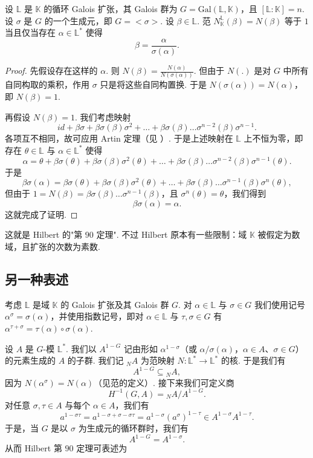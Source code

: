 \begin{theorem}\label{c5-thm-4-3}
设 $\mathbb{L}$ 是 $\mathbb{K}$ 的循环 Galois 扩张，其 Galois 群为 $G=\mathrm{Gal}(\mathbb{L},\mathbb{K})$，且 $[\mathbb{L}:\mathbb{K}]=n$. 设 $\sigma$ 是 $G$ 的一个生成元，即 $G=<\sigma>$. 设 $\beta\in\mathbb{L}$. 范 $N_{\mathbb{K}}^{\mathbb{L}}(\beta)=N(\beta)$ 等于 $1$ 当且仅当存在 $\alpha\in\mathbb{L}^*$ 使得
\[
\beta=\frac{\alpha}{\sigma(\alpha)}.
\]
\end{theorem}

\begin{proof}
先假设存在这样的 $\alpha$. 则 $N(\beta)=\frac{N(\alpha)}{N(\sigma(\alpha))}$. 但由于 $N(.)$ 是对 $G$ 中所有自同构取的乘积，作用 $\sigma$ 只是将这些自同构置换. 于是 $N(\sigma(\alpha))=N(\alpha)$，即 $N(\beta)=1$.

再假设 $N(\beta)=1$. 我们考虑映射
\[
id+\beta\sigma+\beta\sigma(\beta)\sigma^2+\ldots+\beta\sigma(\beta)\ldots\sigma^{n-2}(\beta)\sigma^{n-1}.
\]
各项互不相同，故可应用 Artin 定理（见 \cite[Theorem~4.1, \S4, Chapter~VI]{lang02a}）. 于是上述映射在 $\mathbb{L}$ 上不恒为零，即存在 $\theta\in\mathbb{L}$ 与 $\alpha\in\mathbb{L}^*$ 使得
\[
\alpha=\theta+\beta\sigma(\theta)+\beta\sigma(\beta)\sigma^2(\theta)+\ldots+\beta\sigma(\beta)\ldots\sigma^{n-2}(\beta)\sigma^{n-1}(\theta).
\]
于是
\[
\beta\sigma(\alpha)=\beta\sigma(\theta)+\beta\sigma(\beta)\sigma^2(\theta)+\ldots+\beta\sigma(\beta)\ldots\sigma^{n-1}(\beta)\sigma^n(\theta),
\]
但由于 $1=N(\beta)=\beta\sigma(\beta)\ldots\sigma^{n-1}(\beta)$，且 $\sigma^n(\theta)=\theta$，我们得到
\[
\beta\sigma(\alpha)=\alpha.
\]
这就完成了证明.
\end{proof}

这就是 Hilbert 的"第 $90$ 定理". 不过 Hilbert 原本有一些限制：域 $\mathbb{K}$ 被假定为数域，且扩张的次数为素数.

\subsection{另一种表述}
\label{c5-sub-4-2}

考虑 $\mathbb{L}$ 是域 $\mathbb{K}$ 的 Galois 扩张及其 Galois 群 $G$. 对 $\alpha\in\mathbb{L}$ 与 $\sigma\in G$ 我们使用记号 $\alpha^\sigma=\sigma(\alpha)$，并使用指数记号，即对 $\alpha\in\mathbb{L}$ 与 $\tau,\sigma\in G$ 有 $\alpha^{\tau+\sigma}=\tau(\alpha)\circ\sigma(\alpha)$.

设 $A$ 是 $G$-模 $\mathbb{L}^*$. 我们以 $A^{1-G}$ 记由形如 $\alpha^{1-\sigma}$（或 $\alpha/\sigma(\alpha)$，$\alpha\in A$、$\sigma\in G$）的元素生成的 $A$ 的子群. 我们记 ${}_N A$ 为范映射 $N:\mathbb{L}^*\to\mathbb{L}^*$ 的核. 于是我们有
\[
A^{1-G}\subseteq{}_N A,
\]
因为 $N(\alpha^\sigma)=N(\alpha)$（见范的定义）. 接下来我们可定义商
\[
H^{-1}(G,A)={}_N A/A^{1-G}.
\]
对任意 $\sigma,\tau\in A$ 与每个 $\alpha\in A$，我们有
\[
a^{1-\sigma\tau}=a^{1-\sigma+\sigma-\sigma\tau}=a^{1-\sigma}(a^\sigma)^{1-\tau}\in A^{1-\sigma}A^{1-\tau}.
\]
于是，当 $G$ 是以 $\sigma$ 为生成元的循环群时，我们有
\[
A^{1-G}=A^{1-\sigma}.
\]
从而 Hilbert 第 $90$ 定理可表述为

